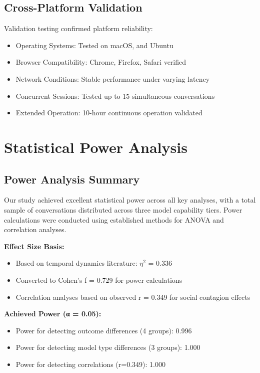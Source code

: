 \documentclass[11pt,letterpaper]{article}
\newcommand{\exponedataTotalSessionsRaw}{67}
\newcommand{\exptwoTotalSessionsRaw}{61}
\newcommand{\expthreeTotalSessionsRaw}{100}
\newcommand{\totalAllPhasesRaw}{\fpeval{\exponedataTotalSessionsRaw + \exptwoTotalSessionsRaw + \expthreeTotalSessionsRaw}}
\newcommand{\powerOutcomeGroups}{0.996}
\newcommand{\powerModelTypes}{1.000}
\newcommand{\powerCorrelation}{1.000}
\newcommand{\powerEtaSquared}{0.336}
\newcommand{\powerCohensF}{0.729}  %
\begin{document}
\subsection{Cross-Platform Validation}

Validation testing confirmed platform reliability:

\begin{itemize}
    \item Operating Systems: Tested on macOS, and Ubuntu
    \item Browser Compatibility: Chrome, Firefox, Safari verified
    \item Network Conditions: Stable performance under varying latency
    \item Concurrent Sessions: Tested up to 15 simultaneous conversations
    \item Extended Operation: 10-hour continuous operation validated
\end{itemize}

\section{Statistical Power Analysis}
\label{app:power}

\subsection{Power Analysis Summary}

Our study achieved excellent statistical power across all key analyses, with a total sample of \totalAllPhasesRaw{} conversations distributed across three model capability tiers. Power calculations were conducted using established methods for ANOVA and correlation analyses.

\textbf{Effect Size Basis:}
\begin{itemize}
    \item Based on temporal dynamics literature: $\eta^2$ = \powerEtaSquared{}
    \item Converted to Cohen's f = \powerCohensF{} for power calculations
    \item Correlation analyses based on observed r = 0.349 for social contagion effects
\end{itemize}

\textbf{Achieved Power (α = 0.05):}
\begin{itemize}
    \item Power for detecting outcome differences (4 groups): \powerOutcomeGroups{}
    \item Power for detecting model type differences (3 groups): \powerModelTypes{}
    \item Power for detecting correlations (r=0.349): \powerCorrelation{}
\end{itemize}
\end{document}
